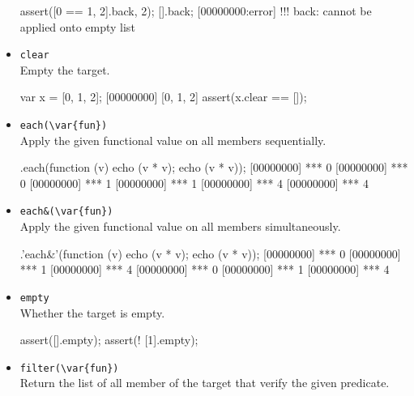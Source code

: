 \begin{itemize}
\begin{urbiscript}[firstnumber=last]
assert([0 == 1, 2].back, 2);
[].back;
[00000000:error] !!! back: cannot be applied onto empty list
\end{urbiscript}

\item \lstinline|clear|\\
  Empty the target.

\begin{urbiscript}[firstnumber=last]
var x = [0, 1, 2];
[00000000] [0, 1, 2]
assert(x.clear == []);
\end{urbiscript}

\item \lstinline|each(\var{fun})|\\
Apply the given functional value on all members sequentially.

\begin{urbiscript}[firstnumber=last]
[0, 1, 2].each(function (v) {echo (v * v); echo (v * v)});
[00000000] *** 0
[00000000] *** 0
[00000000] *** 1
[00000000] *** 1
[00000000] *** 4
[00000000] *** 4
\end{urbiscript}

\item \lstinline|each&(\var{fun})|\\
Apply the given functional value on all members simultaneously.

\begin{urbiscript}[firstnumber=last]
[0, 1, 2].'each&'(function (v) {echo (v * v); echo (v * v)});
[00000000] *** 0
[00000000] *** 1
[00000000] *** 4
[00000000] *** 0
[00000000] *** 1
[00000000] *** 4
\end{urbiscript}

\item \lstinline|empty|\\
  Whether the target is empty.

\begin{urbiscript}[firstnumber=last]
assert([].empty);
assert(! [1].empty);
\end{urbiscript}

\item \lstinline|filter(\var{fun})|\\
Return the list of all member of the target that verify the given
predicate.



\end{itemize}
